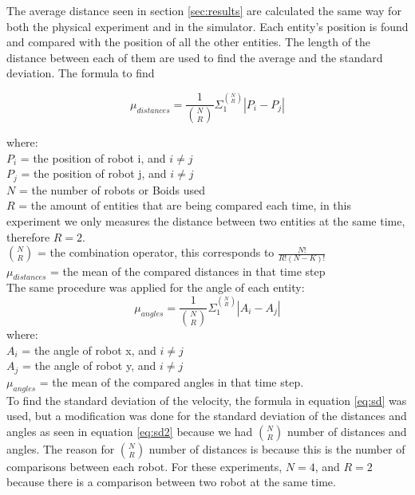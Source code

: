 The average distance seen in section \ref{sec:results} are calculated the same way for both the physical experiment and in the simulator. Each entity's position is found and compared with the position of all the other entities. The length of the distance between each of them are used to find the average and the standard deviation.
The formula to find 

\begin{equation}
\mu_{distances} = \frac{1}{ {N \choose R}} \Sigma_1^{N \choose R} | P_i - P_j |
\end{equation}

where:
\\
$P_i$ = the position of robot i, and $i \neq j$
\\
$P_j$ = the position of robot j, and $i \neq j$
\\
$N$ = the number of robots or Boids used
\\
$R$ = the amount of entities that are being compared each time, in this experiment we only measures the distance between two entities at the same time, therefore $R = 2$.
\\
$N \choose R$ = the combination operator, this corresponds to $ \frac{N!}{R! (N-K)!}$
\\
$\mu_{distances}$ = the mean of the compared distances in that time step
\\

The same procedure was applied for the angle of each entity: 
\begin{equation}
\mu_{angles} = \frac{1}{ {N \choose R}} \Sigma_1^{N \choose R} | A_i - A_j |
\end{equation}
where:
\\
$A_i$ = the angle of robot x, and $i \neq j$
\\
$A_j$ = the angle of robot y, and $i \neq j$
\\
$\mu_{angles}$ = the mean of the compared angles in that time step.
\\

To find the standard deviation of the velocity, the formula in equation \ref{eq:sd} was used, but a modification was done for the standard deviation of the distances and angles as seen in equation \ref{eq:sd2} because we had $ {N \choose R}$ number of distances and angles. The reason for $ {N \choose R}$ number of distances is because this is the number of comparisons between each robot. For these experiments, $N = 4$, and $R = 2$ because there is a comparison between two robot at the same time.


